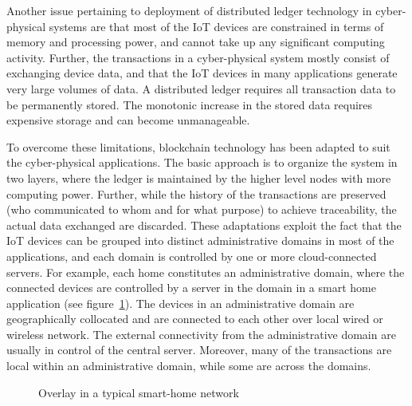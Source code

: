 Another issue pertaining to deployment of distributed ledger technology in cyber-physical systems are that most of the IoT 
devices are constrained in terms of memory and processing power, and cannot take up any significant computing activity. 
Further, the transactions in a cyber-physical system mostly consist of exchanging device data, and that the IoT devices in 
many applications generate very large volumes of data. A distributed ledger requires all transaction data to be permanently 
stored. The monotonic increase in the stored data requires expensive storage and can become unmanageable. 

To overcome these limitations, blockchain technology has been adapted to suit the cyber-physical applications. The basic approach 
is to organize the system in two layers, where the ledger is maintained by the higher level nodes with more computing power. Further, 
while the history of the transactions are preserved (who communicated to whom and for what purpose) to achieve traceability, the 
actual data exchanged are discarded. These adaptations exploit the fact that the 
IoT devices can be grouped into distinct administrative domains in most of the applications, and each domain is controlled by one
or more cloud-connected servers. For example, each home constitutes an administrative domain, where the connected devices are
controlled by a server in the domain in a smart home application (see figure~\ref{fig:ledger:smart-home}). The devices in an 
administrative domain are geographically collocated and are connected to each other over local wired or wireless network. The external
connectivity from the administrative domain are usually in control of the central server. Moreover, many of the transactions 
are local within an administrative domain, while some are across the domains. 

\begin{figure}[!htbp]
	\centerline{
	}
\caption{Overlay in a typical smart-home network}
\label{fig:ledger:smart-home}
\end{figure}

